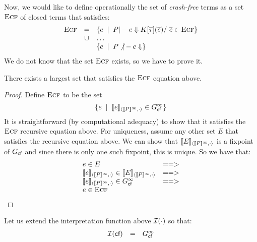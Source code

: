 \documentclass[preprint,nocopyrightspace,draft]{sigplanconf}
\begin{document}
Now, we would like to define operationally the set of {\em crash-free} terms as a set $\textsc{Ecf}$ of 
closed terms that satisfies:
{\setlength{\arraycolsep}{2pt}
\[\begin{array}{rcl}
   \textsc{Ecf} & =    & \{ e \;\mid\; P |- e \Downarrow K[\overline{\tau}](\overline{e}) /\ \overline{e} \in \textsc{Ecf} \} \\
        & \cup & \ldots \\
        &      & \{ e \;\mid\; P \not|- e \Downarrow \} 
\end{array}\]}%
We do not know that the set $\textsc{Ecf}$ exists, so we have to prove it. 
\begin{lemma}
There exists a largest set that satisfies the $\textsc{Ecf}$ equation above.
\end{lemma} 
\begin{proof}
Define $\textsc{Ecf}$ to be the set
\[ \{ e\;\mid\; [\![e]\!]_{\langle {[\![P]\!]^\infty},{\cdot}\rangle} \in G_{\textsf{cf}}^{\infty}\} \]
It is straightforward (by computational adequacy) to show that it satisfies the $\textsc{Ecf}$ recursive
equation above. For uniqueness, assume any other set $E$ that satisfies the recursive equation
above. We can show that $[\![E]\!]_{\langle {[\![P]\!]^\infty},{\cdot}\rangle}$ is a
fixpoint of $G_{\textsf{cf}}$ and since there is only one such fixpoint, this is unique. So we have that:
\[\begin{array}{ll}
 e \in E & ==> \\ 
 \interp{e}{\dbrace{P}^\infty}{\cdot} \in \interp{E}{\dbrace{P}^\infty}{\cdot} & ==> \\
 \interp{e}{\dbrace{P}^\infty}{\cdot} \in G_{\lcfZ}^\infty & ==> \\
 e \in \Ecf 
\end{array}\] 
\end{proof}

Let us extend the interpretation function above ${\cal I}(\cdot)$ so that: 
\[\begin{array}{rcl}
   {\cal I}(\textsf{cf})  & = & G_{\textsf{cf}}^{\infty} 
\end{array}\]
\end{document}
